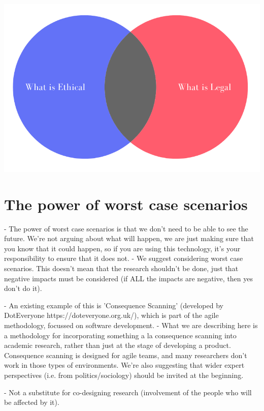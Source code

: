 \documentclass[fleqn,10pt]{olplainarticle}
\begin{document}
 \includegraphics[scale=0.35]{ethical-legal.png}

 
\section*{The power of worst case scenarios}
  
- The power of worst case scenarios is that we don't need to be able to see the future. We're not arguing about what will happen, we are just making sure that you know that it could happen, so if you are using this technology, it's your responsibility to ensure that it does not.
  - We suggest considering worst case scenarios. This doesn't mean that the research shouldn't be done, just that negative impacts must be considered (if ALL the impacts are negative, then yes don't do it).  
  
- An existing example of this is 'Consequence Scanning' (developed by DotEveryone https://doteveryone.org.uk/), which is part of the agile methodology, focussed on software development. 
- What we are describing here is a methodology for incorporating something a la consequence scanning into academic research, rather than just at the stage of developing a product. Consequence scanning is designed for agile teams, and many researchers don't work in those types of environments. We're also suggesting that wider expert perspectives (i.e. from politics/sociology) should be invited at the beginning.

- Not a substitute for co-designing research (involvement of the people who will be affected by it).
\end{document}
